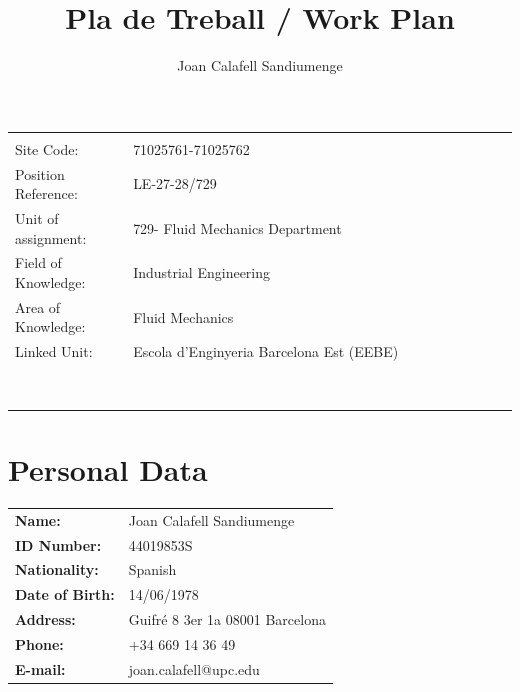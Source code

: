 \documentclass{article}
\title{{\bf Pla de Treball / Work Plan}}
\date{}
\author{\Large Joan Calafell Sandiumenge}
\begin{document}
\maketitle


\thispagestyle{firststyle}

\vspace{1.0cm}

\begin{tabular}{ l l }
\hline \\
 Site Code:          & 71025761-71025762  \\ 
 Position Reference: & LE-27-28/729 \\
 Unit of assignment: & 729- Fluid Mechanics Department  \\  
 Field of Knowledge: & Industrial Engineering \\
 Area of Knowledge:  & Fluid Mechanics \\   
 Linked Unit:        & Escola d’Enginyeria Barcelona Est (EEBE)\\
  $\ $               & $\quad $$\quad $$\quad $$\quad $$\quad $$\quad $$\quad $$\quad $$\quad $$\quad $$\quad $$\quad $$\quad $$\quad $$\quad $$\quad $$\quad $$\quad $$\quad $$\quad $$\quad $$\quad $$\quad $$\quad $$\quad $$\quad $$\quad $$\quad $$\quad $$\quad $$\quad $$\quad $$\quad $$\quad $$\quad $$\quad $$\quad $$\quad $\\
 \hline
\end{tabular}

\newpage

\tableofcontents

\newpage

\section*{Personal Data}

\vspace{0.5cm}

\begin{tabular}{ l l }
 {\bf Name:}               & Joan Calafell Sandiumenge  \\ 
 {\bf ID Number:}          & 44019853S \\
 {\bf Nationality:}        & Spanish  \\  
 {\bf Date of Birth:}      & 14/06/1978 \\
 {\bf Address:}            & Guifré 8 3er 1a 08001 Barcelona \\   
 {\bf Phone:}              & +34 669 14 36 49\\
 {\bf E-mail:}             & joan.calafell@upc.edu\\
\end{tabular}
\end{document}
